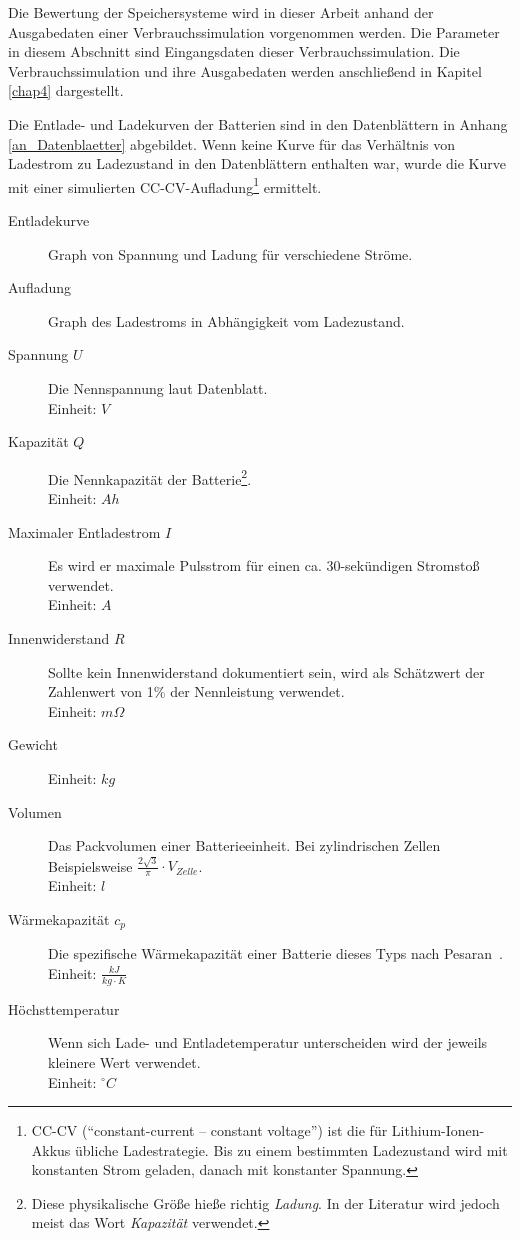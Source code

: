 Die Bewertung der Speichersysteme wird in dieser Arbeit anhand der Ausgabedaten einer Verbrauchssimulation vorgenommen werden. Die Parameter in diesem Abschnitt sind Eingangsdaten dieser Verbrauchssimulation. Die Verbrauchssimulation und ihre Ausgabedaten werden anschließend in Kapitel \ref{chap4} dargestellt.

Die Entlade- und Ladekurven der Batterien sind in den Datenblättern in Anhang \ref{an_Datenblaetter} abgebildet. Wenn keine Kurve für das Verhältnis von Ladestrom zu Ladezustand in den Datenblättern enthalten war, wurde die Kurve mit einer simulierten CC-CV-Aufladung\footnote{CC-CV ("`constant-current – constant voltage"') ist die für Lithium-Ionen-Akkus übliche Ladestrategie. Bis zu einem bestimmten Ladezustand wird mit konstanten Strom geladen, danach mit konstanter Spannung.} ermittelt.
\begin{description}
	\item[Entladekurve] Graph von Spannung und Ladung für verschiedene Ströme.
	\item[Aufladung] Graph des Ladestroms in Abhängigkeit vom Ladezustand.
	\item[Spannung $U$] Die Nennspannung laut Datenblatt.\\
	Einheit: $V$
	\item[Kapazität $Q$] Die Nennkapazität der Batterie\footnote{Diese physikalische Größe hieße richtig \emph{Ladung}. In der Literatur wird jedoch meist das Wort \emph{Kapazität} verwendet.}.\\
	Einheit: $Ah$
	\item[Maximaler Entladestrom $I$] Es wird er maximale Pulsstrom für einen ca. 30-sekündigen Stromstoß verwendet.\\
	Einheit: $A$
	\item[Innenwiderstand $R$] Sollte kein Innenwiderstand dokumentiert sein, wird als Schätzwert der Zahlenwert von 1\% der Nennleistung verwendet.\\
	Einheit: $m\Omega$
	\item[Gewicht] Einheit: $kg$
	\item[Volumen] Das Packvolumen einer Batterieeinheit. Bei zylindrischen Zellen Beispielsweise $\frac{2\sqrt{3}}{\pi} \cdot V_{Zelle}$.\\
	Einheit: $l$
	\item[Wärmekapazität $c_p$] Die spezifische Wärmekapazität einer Batterie dieses Typs nach Pesaran~\cite{pesaran2001battery}.\\
	Einheit: $\frac{kJ}{kg\cdot K}$
	\item[Höchsttemperatur] Wenn sich Lade- und Entladetemperatur unterscheiden wird der jeweils kleinere Wert verwendet.\\
	Einheit: $^{\circ}C$
\end{description}

